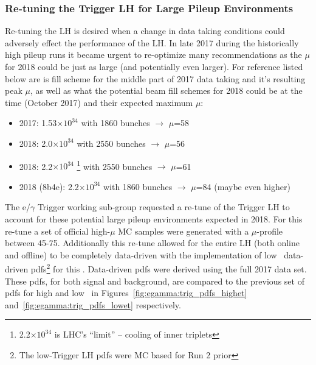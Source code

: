 \subsubsection{Re-tuning the Trigger LH for Large Pileup Environments}
Re-tuning the LH is desired when a change in data taking conditions could adversely effect the performance of the LH.
In late 2017 during the historically high pileup runs it became urgent to re-optimize many recommendations as the $\mu$ for 2018 could be just as large (and potentially even larger).
For reference listed below are is fill scheme for the middle part of 2017 data taking and it's resulting peak $\mu$, as well as what the potential beam fill schemes for 2018 could be at the time (October 2017) and their expected maximum $\mu$:
\begin{itemize}
    \item 2017: 1.53$\times 10^{34}$ with 1860 bunches $\rightarrow$ $\mu$=58
    \item 2018: 2.0$\times 10^{34}$ with 2550 bunches $\rightarrow$ $\mu$=56 
    \item 2018: 2.2$\times 10^{34}$ \footnote{2.2$\times 10^{34}$ is LHC's ``limit'' – cooling of inner triplets} with 2550 bunches $\rightarrow$ $\mu$=61
    \item 2018 (8b4e): 2.2$\times 10^{34}$ with 1860 bunches $\rightarrow$ $\mu$=84 (maybe even higher)
\end{itemize}
The e/$\gamma$ Trigger working sub-group requested a re-tune of the Trigger LH to account for these potential large pileup environments expected in 2018.
For this re-tune a set of official high-$\mu$ MC samples were generated with a $\mu$-profile between 45-75.
Additionally this re-tune allowed for the entire LH (both online and offline) to be completely data-driven with the implementation of low \et\ data-driven pdfs\footnote{The low-\et Trigger LH pdfs were MC based for Run 2 prior} for this \tune.
Data-driven pdfs were derived using the full 2017 data set.
These pdfs, for both signal and background, are compared to the previous set of pdfs for high and low \et\ in Figures~\ref{fig:egamma:trig_pdfs_highet} and~\ref{fig:egamma:trig_pdfs_lowet} respectively.

